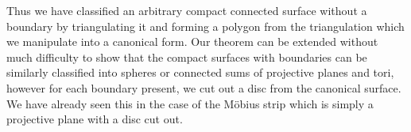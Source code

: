 Thus we have classified an arbitrary compact connected surface without a boundary by triangulating it and forming a polygon from the triangulation which we manipulate into a canonical form. Our theorem can be extended without much difficulty to show that the compact surfaces with boundaries can be similarly classified into spheres or connected sums of projective planes and tori, however for each boundary present, we cut out a disc from the canonical surface. We have already seen this in the case of the M\"obius strip which is simply a projective plane with a disc cut out.



